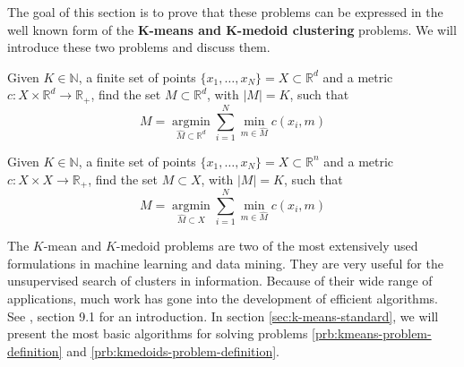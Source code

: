 The goal of this section is to prove that these problems can be expressed in the well known form of the \textbf{$\mathbf{K}$-means and $\mathbf{K}$-medoid clustering} problems.
We will introduce these two problems and discuss them.
\begin{problem}
  \label{prb:kmeans-problem-definition}
  Given $K\in \mathbb{N}$, a finite set of points $\{x_1,\ldots , x_N\} = X\subset\mathbb{R}^d$ and a metric $c:X\times \mathbb{R}^d\rightarrow\mathbb{R}_+$, find the set $M\subset\mathbb{R}^d$, with $|M|=K$, such that
  \begin{equation}
    \label{eq:kmeans-problem-definition}
    M = \underset{\hat{M}\subset\mathbb{R}^{d}}{\operatorname{argmin}} \sum_{i=1}^N\min\limits_{m\in \hat{M}}c(x_i, m)
  \end{equation}
\end{problem}
\begin{problem}
  \label{prb:kmedoids-problem-definition}
  Given $K\in \mathbb{N}$, a finite set of points $\{x_1,\ldots , x_N\} = X\subset\mathbb{R}^n$ and a metric $c:X\times X\rightarrow\mathbb{R}_+$, find the set $M\subset X$, with $|M|=K$, such that
  \begin{equation}
    \label{eq:kmedoids-problem-definition}
    M = \underset{\hat{M}\subset X}{\operatorname{argmin}} \sum_{i=1}^N\min\limits_{m\in \hat{M}}c(x_i, m)
  \end{equation}
\end{problem}
The $K$-mean and $K$-medoid problems are two of the most extensively used formulations in machine learning and data mining.
They are very useful for the unsupervised search of clusters in information.
Because of their wide range of applications, much work has gone into the development of efficient algorithms.
See \cite{Bishop2006}, section 9.1 for an introduction.
In section \ref{sec:k-means-standard}, we will present the most basic algorithms for solving problems \ref{prb:kmeans-problem-definition} and \ref{prb:kmedoids-problem-definition}.
